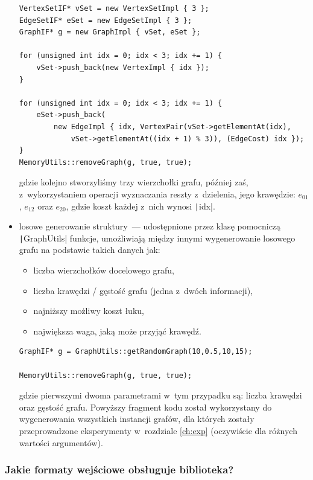 \begin{itemize}
	\begin{verbatim}
VertexSetIF* vSet = new VertexSetImpl { 3 };
EdgeSetIF* eSet = new EdgeSetImpl { 3 };
GraphIF* g = new GraphImpl { vSet, eSet };

for (unsigned int idx = 0; idx < 3; idx += 1) {
	vSet->push_back(new VertexImpl { idx });
}

for (unsigned int idx = 0; idx < 3; idx += 1) {
	eSet->push_back(
		new EdgeImpl { idx, VertexPair(vSet->getElementAt(idx),
			vSet->getElementAt((idx + 1) % 3)), (EdgeCost) idx });
}
MemoryUtils::removeGraph(g, true, true);
	\end{verbatim}
	gdzie kolejno stworzyliśmy trzy wierzchołki grafu, później zaś, z~wykorzystaniem operacji wyznaczania reszty z~dzielenia, jego krawędzie: $e_{01}$, $e_{12}$ oraz $e_{20}$, gdzie koszt każdej z~nich wynosi \texttt|idx|.
	\item losowe generowanie struktury~--- udostępnione przez klasę pomocniczą \texttt|GraphUtils| funkcje, umożliwiają między innymi wygenerowanie losowego grafu na podstawie takich danych jak:
	\begin{itemize}
		\item liczba wierzchołków docelowego grafu,
		\item liczba krawędzi / gęstość grafu (jedna z~dwóch informacji),
		\item najniższy możliwy koszt łuku,
		\item największa waga, jaką może przyjąć krawędź.
	\end{itemize}

	\begin{verbatim}
GraphIF* g = GraphUtils::getRandomGraph(10,0.5,10,15);

MemoryUtils::removeGraph(g, true, true);
	\end{verbatim}
	gdzie pierwszymi dwoma parametrami w~tym przypadku są: liczba krawędzi oraz gęstość grafu.
	Powyższy fragment kodu został wykorzystany do wygenerowania wszystkich instancji grafów, dla których zostały przeprowadzone eksperymenty w~rozdziale \ref{ch:exp} (oczywiście dla różnych wartości argumentów).	
\end{itemize}


\subsubsection{Jakie formaty wejściowe obsługuje biblioteka?}


